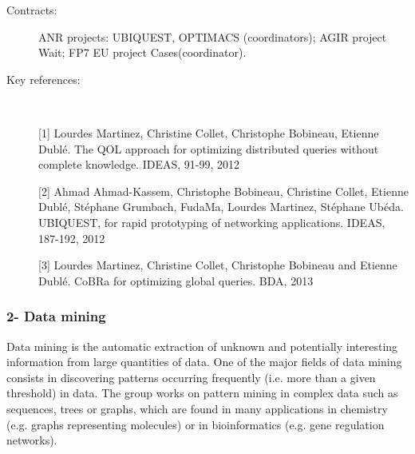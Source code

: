 \begin{description}
\item[Contracts:] ANR projects: UBIQUEST, OPTIMACS (coordinators);  AGIR project Wait; FP7 EU project Cases(coordinator).  

\item[Key references:]~%

[1]	Lourdes Martinez, Christine Collet, Christophe Bobineau, Etienne Dubl{\'e}. The QOL approach for optimizing distributed queries without complete knowledge. IDEAS, 91-99, 2012

[2] Ahmad Ahmad-Kassem, Christophe Bobineau, Christine Collet, Etienne Dubl{\'e}, St{\'e}phane Grumbach, FudaMa, Lourdes Martinez, St{\'e}phane Ub{\'e}da. UBIQUEST, for rapid prototyping of networking applications. IDEAS, 187-192, 2012

[3] Lourdes Martinez, Christine Collet, Christophe Bobineau and Etienne Dubl{\'e}. CoBRa for optimizing global queries. BDA, 2013


\end{description}

\subsubsection*{2- Data mining}


Data mining is the automatic extraction of unknown and potentially interesting information from large quantities of data. One of the major fields of data mining consists in discovering patterns occurring frequently (i.e. more than a given threshold) in data. 
The group works on pattern mining in complex data such as sequences, trees or graphs, which are found in many applications in chemistry (e.g. graphs representing molecules) or in bioinformatics (e.g. gene regulation networks).

